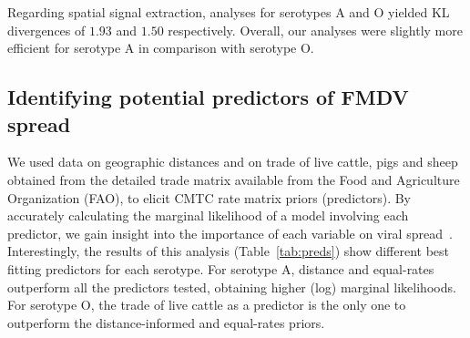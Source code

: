 \documentclass[10pt]{article}
\begin{document}


Regarding spatial signal extraction, analyses for serotypes  A and O yielded KL divergences of $1.93$ and $1.50$ respectively.
Overall, our analyses were slightly more efficient for serotype A in comparison with serotype O.

\subsection*{Identifying potential predictors of FMDV spread}

We used data on geographic distances and on trade of live cattle, pigs and sheep obtained from the detailed trade matrix available from the Food and Agriculture Organization (FAO), to elicit CMTC rate matrix priors (predictors).
By accurately calculating the marginal likelihood of a model involving each predictor, we gain insight into the importance of each variable on viral spread~\cite{Carvalho2013, Nelson2011}.
%
Interestingly, the results of this analysis (Table~\ref{tab:preds}) show different best fitting predictors for each serotype.
For serotype A, distance and equal-rates outperform all the predictors tested, obtaining higher (log) marginal likelihoods.
For serotype O, the trade of live cattle as a predictor is the only one to outperform the distance-informed and equal-rates  priors.
\end{document}
